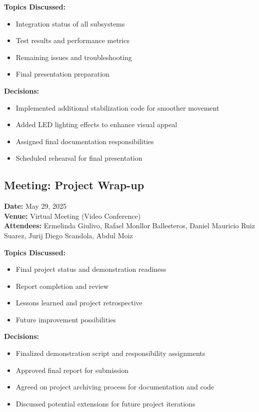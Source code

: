 \textbf{Topics Discussed:}
\begin{itemize}
    \item Integration status of all subsystems
    \item Test results and performance metrics
    \item Remaining issues and troubleshooting
    \item Final presentation preparation
\end{itemize}

\textbf{Decisions:}
\begin{itemize}
    \item Implemented additional stabilization code for smoother movement
    \item Added LED lighting effects to enhance visual appeal
    \item Assigned final documentation responsibilities
    \item Scheduled rehearsal for final presentation
\end{itemize}

\subsection{Meeting: Project Wrap-up}
\textbf{Date:} May 29, 2025\\
\textbf{Venue:} Virtual Meeting (Video Conference)\\
\textbf{Attendees:} Ermelinda Giulivo, Rafael Monllor Ballesteros, Daniel Mauricio Ruiz Suarez, Jurij Diego Scandola, Abdul Moiz

\textbf{Topics Discussed:}
\begin{itemize}
    \item Final project status and demonstration readiness
    \item Report completion and review
    \item Lessons learned and project retrospective
    \item Future improvement possibilities
\end{itemize}

\textbf{Decisions:}
\begin{itemize}
    \item Finalized demonstration script and responsibility assignments
    \item Approved final report for submission
    \item Agreed on project archiving process for documentation and code
    \item Discussed potential extensions for future project iterations
\end{itemize}
